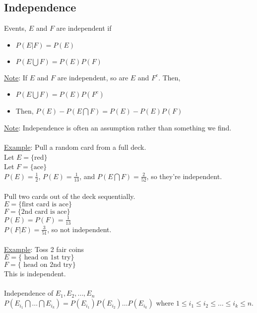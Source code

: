   \subsection*{Independence}
    Events, $E$ and $F$ are independent if
    \begin{itemize}
      \item $P(E|F) = P(E)$
      \item $P(E \bigcup F) = P(E)P(F)$
    \end{itemize}
    \underline{Note}: If $E$ and $F$ are independent, so are $E$ and $F^c$. 
      Then,
      \begin{itemize}
        \item $P(E \bigcup F) = P(E)P(F^c)$
        \item Then, $P(E) - P(E \bigcap F) = P(E) - P(E)P(F)$
      \end{itemize}
    \underline{Note}: Independence is often an assumption rather than something
    we find.\\\\
    \underline{Example}: Pull a random card from a full deck.\\
    Let $E = \{ \text{red} \}$\\
    Let $F = \{ \text{ace} \}$\\
    $P(E) = \frac{1}{2}$, $P(E) = \frac{1}{13}$, and $P(E \bigcap F) = 
    \frac{2}{52}$, so they're independent.\\\\
    Pull two cards out of the deck sequentially.\\
    $E = \{\text{first card is ace}\}$\\
    $F = \{\text{2nd card is ace}\}$\\
    $P(E) = P(F) = \frac{1}{13}$\\
    $P(F | E) = \frac{3}{51}$, so not independent.\\\\
    \underline{Example}: Toss 2 fair coins\\
    $E = \{ \text{ head on 1st try}\}$\\
    $F = \{ \text{ head on 2nd try}\}$\\
    This is independent.\\\\
    Independence of $E_1, E_2, \ldots, E_n$\\
    $P(E_{i_1} \bigcap \ldots \bigcap E_{i_k}) = P(E_{i_1})P(E_{i_2})\ldots 
    P(E_{i_k})$ where $1 \le i_1 \le i_2 \le \ldots \le i_k \le n$.\\\\
